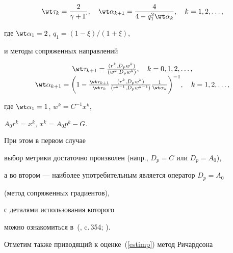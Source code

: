 \begin{equation}


\label{3cheb}


\wt \tau_k = \frac2{\gamma + \Gamma}, \quad


\wt \alpha_{k+1} = \frac4{4 - q_1^2 \wt \alpha_{k}}, \quad


k = 1, 2, \dotsc,


\end{equation}


где $\wt \alpha_{1} = 2$, $q_1 = (1 - \xi)/(1 + \xi)$,





и методы сопряженных направлений


\begin{equation}


\label{msg}


\begin{array}{c}


\wt\tau_{k+1}=\frac{(r^k,D_p w^k)}{(w^k,D_p w^k)},


\quad k = 0, 1, 2, \dotsc, \\


\wt \alpha_{k+1} = \bigg(1-\frac{\wt \tau_{k+1}}{\wt \tau_{k}}


\frac{(r^k,D_p w^k)}{(r^{k-1},D_p w^{k-1})}


\frac1{\wt \alpha_{k}} \bigg)^{-1},


\quad


k = 1, 2, \dotsc ,


\end{array}


\end{equation}


где $\wt \alpha_{1} = 1$, $w^k = C^{-1} x^k$,


$A_0 r^k = x^k$, $x^k = A_0 p^k - G$.


При этом в первом случае


выбор метрики достаточно произволен (напр., $D_p = C$ или $D_p = A_0$),


а во втором --- наиболее употребительным является оператор $D_p = A_0$


(метод сопряженных градиентов),


с деталями использования которого


можно ознакомиться в~(\cite{SamNik}, c.\,354; \cite{Heusser}).





Отметим также приводящий к оценке~(\ref{estimp}) метод Ричардсона


